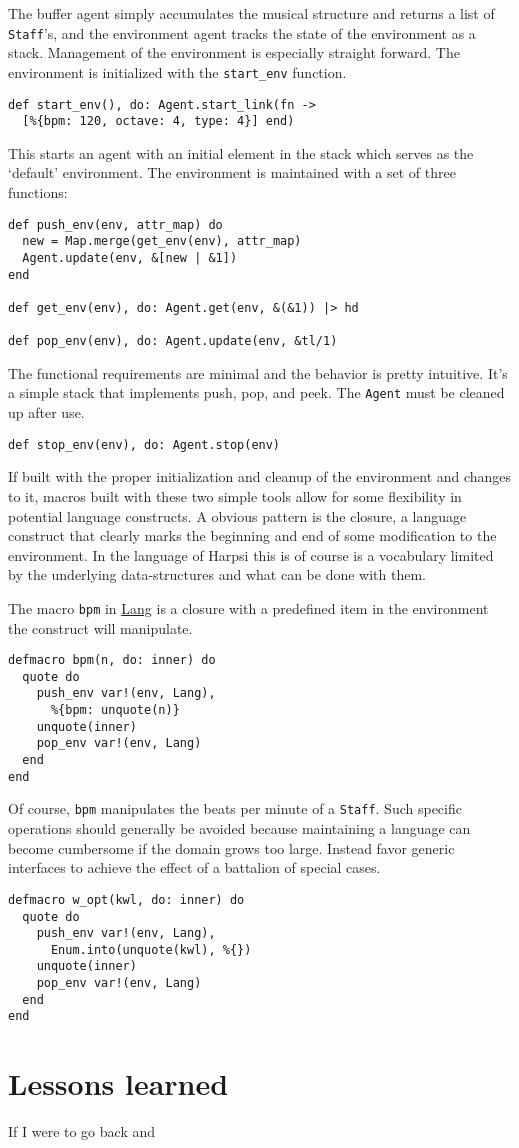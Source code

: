 \documentclass[11pt]{article}
\begin{document}
The buffer agent simply accumulates the musical structure and
returns a list of \texttt{Staff}'s, and the environment agent tracks the
state of the environment as a stack. Management of the environment
is especially straight forward. The environment is initialized with
the \texttt{start\_env} function.
\begin{verbatim}
def start_env(), do: Agent.start_link(fn ->
  [%{bpm: 120, octave: 4, type: 4}] end)
\end{verbatim}
This starts an agent with an initial element in the stack which
serves as the `default' environment. The environment is maintained
with a set of three functions:
\begin{verbatim}
def push_env(env, attr_map) do
  new = Map.merge(get_env(env), attr_map)
  Agent.update(env, &[new | &1])
end

def get_env(env), do: Agent.get(env, &(&1)) |> hd

def pop_env(env), do: Agent.update(env, &tl/1)
\end{verbatim}
The functional requirements are minimal and the behavior
is pretty intuitive. It's a simple stack that implements push, pop,
and peek. The \texttt{Agent} must be cleaned up after use.
\begin{verbatim}
def stop_env(env), do: Agent.stop(env)
\end{verbatim}

If built with the proper initialization and cleanup of the
environment and changes to it, macros built with these two simple
tools allow for some flexibility in potential language
constructs. A obvious pattern is the closure, a language construct
that clearly marks the beginning and end of some modification to
the environment. In the language of Harpsi this is of course is a
vocabulary limited by the underlying data-structures and what can
be done with them.

The macro \texttt{bpm} in \href{lib/lang.ex}{Lang} is a closure with a predefined item in the
environment the construct will manipulate.
\begin{verbatim}
defmacro bpm(n, do: inner) do
  quote do
    push_env var!(env, Lang),
      %{bpm: unquote(n)}
    unquote(inner)
    pop_env var!(env, Lang)
  end
end
\end{verbatim}
Of course, \texttt{bpm} manipulates the beats per minute of a
\texttt{Staff}. Such specific operations should generally be avoided
because maintaining a language can become cumbersome if the domain
grows too large. Instead favor generic interfaces to achieve the
effect of a battalion of special cases.
\begin{verbatim}
defmacro w_opt(kwl, do: inner) do
  quote do
    push_env var!(env, Lang),
      Enum.into(unquote(kwl), %{})
    unquote(inner)
    pop_env var!(env, Lang)
  end
end
\end{verbatim}
\section{Lessons learned}
\label{sec-4}
If I were to go back and 
\end{document}

